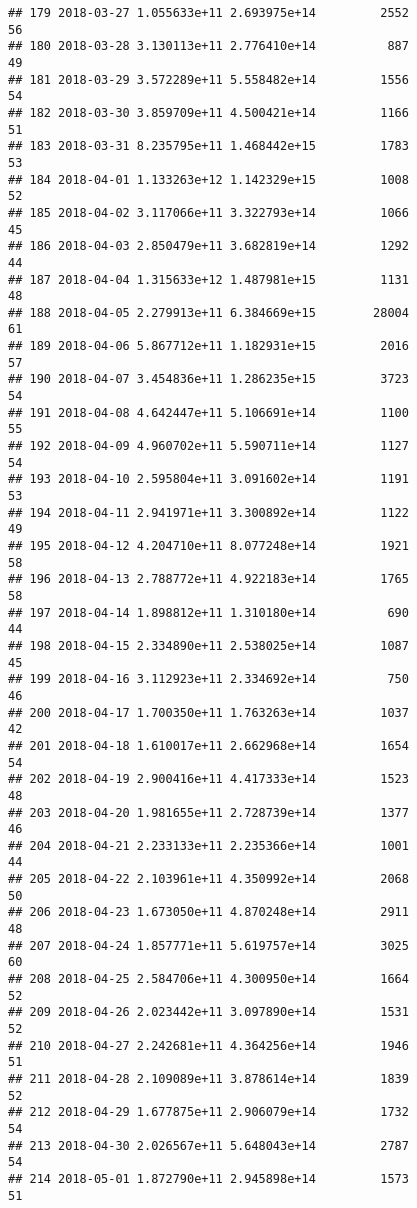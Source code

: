 \documentclass[]{article}
\begin{document}
\begin{verbatim}
## 179 2018-03-27 1.055633e+11 2.693975e+14         2552              56
## 180 2018-03-28 3.130113e+11 2.776410e+14          887              49
## 181 2018-03-29 3.572289e+11 5.558482e+14         1556              54
## 182 2018-03-30 3.859709e+11 4.500421e+14         1166              51
## 183 2018-03-31 8.235795e+11 1.468442e+15         1783              53
## 184 2018-04-01 1.133263e+12 1.142329e+15         1008              52
## 185 2018-04-02 3.117066e+11 3.322793e+14         1066              45
## 186 2018-04-03 2.850479e+11 3.682819e+14         1292              44
## 187 2018-04-04 1.315633e+12 1.487981e+15         1131              48
## 188 2018-04-05 2.279913e+11 6.384669e+15        28004              61
## 189 2018-04-06 5.867712e+11 1.182931e+15         2016              57
## 190 2018-04-07 3.454836e+11 1.286235e+15         3723              54
## 191 2018-04-08 4.642447e+11 5.106691e+14         1100              55
## 192 2018-04-09 4.960702e+11 5.590711e+14         1127              54
## 193 2018-04-10 2.595804e+11 3.091602e+14         1191              53
## 194 2018-04-11 2.941971e+11 3.300892e+14         1122              49
## 195 2018-04-12 4.204710e+11 8.077248e+14         1921              58
## 196 2018-04-13 2.788772e+11 4.922183e+14         1765              58
## 197 2018-04-14 1.898812e+11 1.310180e+14          690              44
## 198 2018-04-15 2.334890e+11 2.538025e+14         1087              45
## 199 2018-04-16 3.112923e+11 2.334692e+14          750              46
## 200 2018-04-17 1.700350e+11 1.763263e+14         1037              42
## 201 2018-04-18 1.610017e+11 2.662968e+14         1654              54
## 202 2018-04-19 2.900416e+11 4.417333e+14         1523              48
## 203 2018-04-20 1.981655e+11 2.728739e+14         1377              46
## 204 2018-04-21 2.233133e+11 2.235366e+14         1001              44
## 205 2018-04-22 2.103961e+11 4.350992e+14         2068              50
## 206 2018-04-23 1.673050e+11 4.870248e+14         2911              48
## 207 2018-04-24 1.857771e+11 5.619757e+14         3025              60
## 208 2018-04-25 2.584706e+11 4.300950e+14         1664              52
## 209 2018-04-26 2.023442e+11 3.097890e+14         1531              52
## 210 2018-04-27 2.242681e+11 4.364256e+14         1946              51
## 211 2018-04-28 2.109089e+11 3.878614e+14         1839              52
## 212 2018-04-29 1.677875e+11 2.906079e+14         1732              54
## 213 2018-04-30 2.026567e+11 5.648043e+14         2787              54
## 214 2018-05-01 1.872790e+11 2.945898e+14         1573              51

\end{verbatim}
\end{document}
